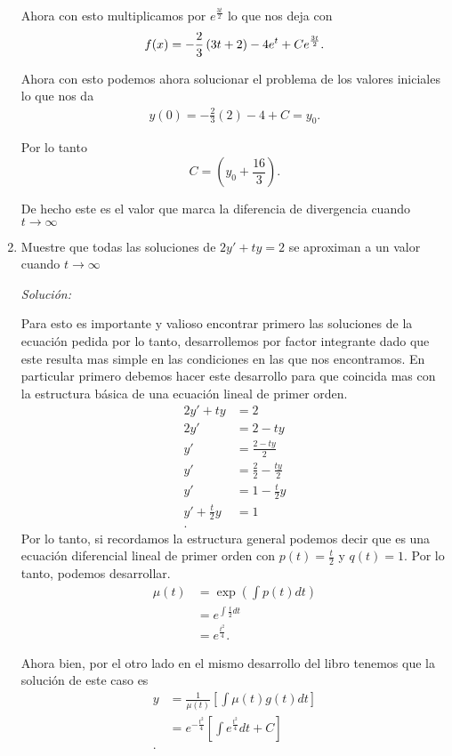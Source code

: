 \begin{enumerate}
	Ahora con esto multiplicamos por $e^{\frac{3t}{2}}$ lo que nos deja con \[
	  f(x) = -\frac{2}{3}\left( 3t+2 \right) -4e^{t} + Ce^{\frac{3t}{2}} \\
	.\] 


	Ahora con esto podemos ahora solucionar el problema de los valores iniciales lo que nos da
	\begin{align*}
	  y\left( 0 \right) = -\frac{2}{3}\left( 2 \right) - 4 + C = y_0
	.\end{align*}

	Por lo tanto \[
	  C = \left( y_0 + \frac{16}{3} \right) 
	.\] 

	De hecho este es el valor que marca la diferencia de divergencia cuando $t\to \infty$
      \item Muestre que todas las soluciones de $2y' + ty = 2$ se aproximan a un valor cuando $t\to \infty$

	\textit{Solución:}

	Para esto es importante y valioso encontrar primero las soluciones de la ecuación pedida por lo tanto, desarrollemos por factor integrante dado que este resulta mas simple en las condiciones en las que nos encontramos. En particular primero debemos hacer este desarrollo para que coincida mas con la estructura básica de una ecuación lineal de primer orden.
	\begin{align*}
	  2y' + ty &= 2 \\
	  2y' &= 2-ty \\
	  y' &= \frac{2-ty}{2} \\
	  y' &= \frac{2}{2}-\frac{ty}{2} \\
	  y' &= 1 - \frac{t}{2}y \\
	  y' + \frac{t}{2}y &= 1 \\
	.\end{align*}
	Por lo tanto, si recordamos la estructura general podemos decir que es una ecuación diferencial lineal de primer orden con $p\left( t \right) = \frac{t}{2}$ y $q\left( t \right) = 1$. Por lo tanto, podemos desarrollar. 
	\begin{align*}
	  \mu\left( t \right) &= \exp\left( \int p\left( t \right) dt \right) \\
	  &= e^{\int \frac{t}{2} dt} \\
	  &= e^{\frac{t^2}{4}}
	.\end{align*}
	
	Ahora bien, por el otro lado en el mismo desarrollo del libro tenemos que la solución de este caso es 
	\begin{align*}
	  y &= \frac{1}{\mu\left( t \right) }\left[ \int\mu\left( t \right) g\left( t \right) dt \right] \\
	  &= e^{-\frac{t^2}{4}}\left[ \int e^{\frac{t^2}{4}} dt + C \right]  \\
	.\end{align*}


\end{enumerate}
